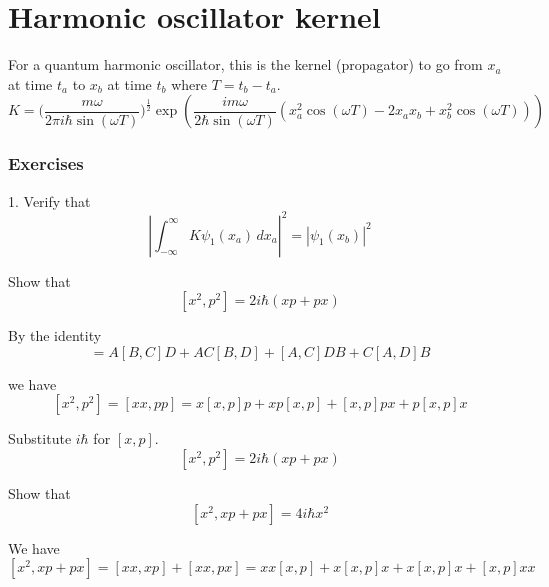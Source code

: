 

\section*{Harmonic oscillator kernel}

For a quantum harmonic oscillator, this is the kernel (propagator) to go from $x_a$ at time $t_a$
to $x_b$ at time $t_b$ where $T=t_b-t_a$.
\begin{equation*}
K=\biggl(\frac{m\omega}{2\pi i\hbar\sin(\omega T)}\biggr)^\frac{1}{2}
\exp\left(\frac{im\omega}{2\hbar\sin(\omega T)}
\left(
x_a^2\cos(\omega T)-2x_ax_b+x_b^2\cos(\omega T)
\right)
\right)
\end{equation*}

\subsubsection*{Exercises}

1. Verify that
\begin{equation*}
\left|\int_{-\infty}^\infty K\psi_1(x_a)\,dx_a\right|^2=\left|\psi_1(x_b)\right|^2
\end{equation*}




Show that
\begin{equation*}
\left[x^2,p^2\right]=2i\hbar(xp+px)
\tag{1}
\end{equation*}

By the identity
\begin{equation*}
[AB,CD]=A[B,C]D+AC[B,D]+[A,C]DB+C[A,D]B
\end{equation*}

we have
\begin{equation*}
\left[x^2,p^2\right]=[xx,pp]=x[x,p]p+xp[x,p]+[x,p]px+p[x,p]x
\end{equation*}

Substitute $i\hbar$ for $[x,p]$.
\begin{equation*}
\left[x^2,p^2\right]=2i\hbar(xp+px)
\end{equation*}

Show that
\begin{equation*}
\left[x^2,xp+px\right]=4i\hbar x^2
\tag{2}
\end{equation*}

We have
\begin{equation*}
\left[x^2,xp+px\right]=[xx,xp]+[xx,px]
=xx[x,p]+x[x,p]x+x[x,p]x+[x,p]xx
\end{equation*}

